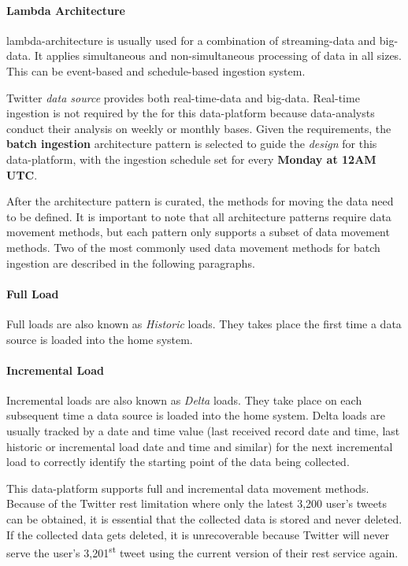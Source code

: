 \paragraph{Lambda Architecture} \gls{lambda-architecture} is usually used for a combination of \gls{streaming-data} and \gls{big-data}. It applies simultaneous and non-simultaneous processing of data in all sizes. This can be \gls{event-based} and \gls{schedule-based} ingestion system.

\hfill

Twitter \textit{data source} provides both \gls{real-time-data} and \gls{big-data}. Real-time ingestion is not required by the  for this \gls{data-platform} because \glspl{data-analyst} conduct their analysis on weekly or monthly bases. Given the requirements, the \textbf{batch ingestion} architecture pattern is selected to guide the \textit{design} for this \gls{data-platform}, with the ingestion schedule set for every \textbf{Monday at 12AM UTC}.

After the architecture pattern is curated, the methods for moving the data need to be defined. It is important to note that all architecture patterns require data movement methods, but each pattern only supports a subset of data movement methods. Two of the most commonly used data movement methods for batch ingestion are described in the following paragraphs.

\hfill

\paragraph{Full Load} Full loads are also known as \textit{Historic} loads. They takes place the first time a data source is loaded into the home system.

\paragraph{Incremental Load} Incremental loads are also known as \textit{Delta} loads. They take place on each subsequent time a data source is loaded into the home system. Delta loads are usually tracked by a date and time value (last received record date and time, last historic or incremental load date and time and similar) for the next incremental load to correctly identify the starting point of the data being collected.

\hfill

This \gls{data-platform} supports full and incremental data movement methods. Because of the Twitter \acrshort{rest} limitation where only the latest 3,200 user's tweets can be obtained, it is essential that the collected data is stored and never deleted. If the collected data gets deleted, it is unrecoverable because Twitter will never serve the user's 3,201\textsuperscript{st} tweet using the current version of their \acrshort{rest} service again.

